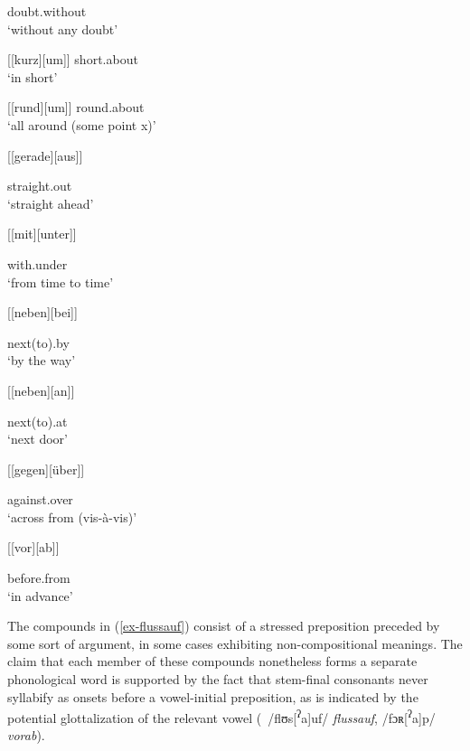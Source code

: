 \documentclass[output=paper
 ,nobabel
 ,draftmode
 ,colorlinks, citecolor=brown
]{langscibook}
\begin{document}
doubt.without\\
`without any doubt'		

\ex {}[[kurz][um]] 
short.about\\
`in short'		

\ex {}[[rund][um]] 
round.about\\
`all around (some point x)'		

\ex {}[[gerade][aus]] 

straight.out\\
`straight ahead'

\ex {}[[mit][unter]] 

with.under\\
`from time to time'		

\ex {}[[neben][bei]] 

next(to).by\\
`by the way'		

\ex {}[[neben][an]] 

next(to).at\\
`next door'		

\ex {}[[gegen][über]] 

against.over\\
`across from (vis-à-vis)'

\ex {}[[vor][ab]] 

before.from\\
`in advance'		
\z
\z

\noindent
The compounds in (\ref{ex-flussauf}) consist of a stressed preposition preceded by some sort of argument, in some cases exhibiting non-compositional meanings. The claim that each member of these compounds nonetheless forms a separate phonological word is supported by the fact that stem-final consonants never syllabify as onsets before a vowel-initial preposition, as is indicated by the potential glottalization of the relevant vowel (\eg\ /flʊs[\textsuperscript{ʔ}a]uf/ \emph{flussauf}, /fɔʀ[\textsuperscript{ʔ}a]p/ \emph{vorab}).
 
\end{document}
